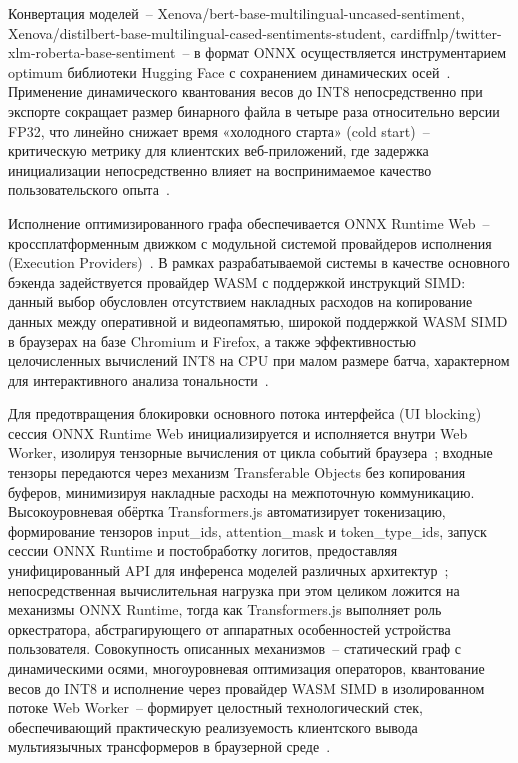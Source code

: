 Конвертация моделей~– Xenova/bert-base-multilingual-uncased-sentiment, Xenova/distilbert-base-multilingual-cased-sentiments-student, cardiffnlp/twitter-xlm-roberta-base-sentiment~– в формат ONNX осуществляется инструментарием optimum библиотеки Hugging Face с сохранением динамических осей~\cite{tang2024transformer}. Применение динамического квантования весов до INT8 непосредственно при экспорте сокращает размер бинарного файла в четыре раза относительно версии FP32, что линейно снижает время «холодного старта» (cold start)~– критическую метрику для клиентских веб-приложений, где задержка инициализации непосредственно влияет на воспринимаемое качество пользовательского опыта~\cite{gholami2021quantization}.

Исполнение оптимизированного графа обеспечивается ONNX Runtime Web~– кроссплатформенным движком с модульной системой провайдеров исполнения (Execution Providers)~\cite{onnxruntime2024}. В рамках разрабатываемой системы в качестве основного бэкенда задействуется провайдер WASM с поддержкой инструкций SIMD: данный выбор обусловлен отсутствием накладных расходов на копирование данных между оперативной и видеопамятью, широкой поддержкой WASM SIMD в браузерах на базе Chromium и Firefox, а также эффективностью целочисленных вычислений INT8 на CPU при малом размере батча, характерном для интерактивного анализа тональности~\cite{wang2024anatomizing}.

Для предотвращения блокировки основного потока интерфейса (UI blocking) сессия ONNX Runtime Web инициализируется и исполняется внутри Web Worker, изолируя тензорные вычисления от цикла событий браузера~\cite{jia2024empowering}; входные тензоры передаются через механизм Transferable Objects без копирования буферов, минимизируя накладные расходы на межпоточную коммуникацию. Высокоуровневая обёртка Transformers.js автоматизирует токенизацию, формирование тензоров input\_ids, attention\_mask и token\_type\_ids, запуск сессии ONNX Runtime и постобработку логитов, предоставляя унифицированный API для инференса моделей различных архитектур~\cite{ruan2024webllm}; непосредственная вычислительная нагрузка при этом целиком ложится на механизмы ONNX Runtime, тогда как Transformers.js выполняет роль оркестратора, абстрагирующего от аппаратных особенностей устройства пользователя. Совокупность описанных механизмов~– статический граф с динамическими осями, многоуровневая оптимизация операторов, квантование весов до INT8 и исполнение через провайдер WASM SIMD в изолированном потоке Web Worker~– формирует целостный технологический стек, обеспечивающий практическую реализуемость клиентского вывода мультиязычных трансформеров в браузерной среде~\cite{xu2022survey}.
